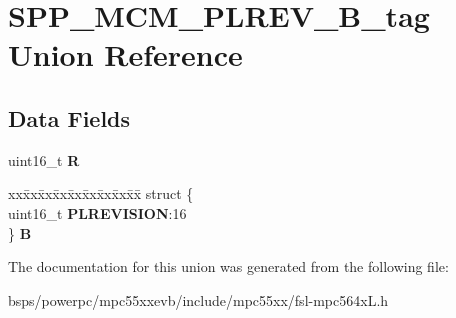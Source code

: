 \hypertarget{unionSPP__MCM__PLREV__16B__tag}{}\section{S\+P\+P\+\_\+\+M\+C\+M\+\_\+\+P\+L\+R\+E\+V\+\_\+B\+\_\+tag Union Reference}
\label{unionSPP__MCM__PLREV__16B__tag}
\subsection*{Data Fields}
\begin{DoxyCompactItemize}
\item 
\mbox{\label{unionSPP__MCM__PLREV__16B__tag_ae23434bffc703121d6c1da59443c2711}} 
uint16\+\_\+t {\bfseries R}
\item 
\mbox{\label{unionSPP__MCM__PLREV__16B__tag_a868f0edc31a2f4f29dc89ede09ff1685}} 
\begin{tabbing}
xx\=xx\=xx\=xx\=xx\=xx\=xx\=xx\=xx\=\kill
struct \{\\
\>uint16\_t {\bfseries PLREVISION}:16\\
\} {\bfseries B}\\

\end{tabbing}\end{DoxyCompactItemize}


The documentation for this union was generated from the following file\+:\begin{DoxyCompactItemize}
\item 
bsps/powerpc/mpc55xxevb/include/mpc55xx/fsl-\/mpc564x\+L.\+h\end{DoxyCompactItemize}
